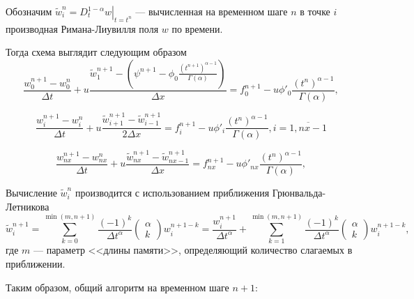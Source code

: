 Обозначим $\tilde{w}^n_i = \left.D^{1-\alpha}_t w \right|_{t=t^n}$ --- вычисленная на временном шаге $n$ в точке $i$ производная Римана-Лиувилля поля $w$ по времени.

Тогда схема выглядит следующим образом
\begin{equation}
	\label{eq:num2}
	\frac{w^{n+1}_{0} - w^{n}_{0}}{\Delta t}
	+ u
	\frac
		{\tilde{w}_1^{n+1} -
			\left( \psi^{n+1} - \phi_0
			\frac
				{\left(t^{n+1}\right)^{\alpha - 1}}
				{\Gamma(\alpha)}
			\right)
		}
		{\Delta x} 
	= f_0^{n+1} - u \phi'_0\frac{\left(t^n\right)^{\alpha - 1}}{\Gamma(\alpha)},
\end{equation}

\begin{equation}
	\label{eq:num3}
	\frac{w^{n+1}_{i} - w^{n}_{i}}{\Delta t}
	+ u \frac{
		\tilde{w}^{n+1}_{i+1} -
		\tilde{w}^{n+1}_{i-1} }
	{2 \Delta x}
	= f_i^{n+1} - u \phi'_{i}\frac{\left(t^n\right)^{\alpha - 1}}{\Gamma(\alpha)},
	i=\overline{1,nx-1}
\end{equation}

\begin{equation}
	\label{eq:num4}
	\frac{w^{n+1}_{nx} - w^{n}_{nx}}{\Delta t}
	+ u \frac{
		\tilde{w}^{n+1}_{nx} -
		\tilde{w}^{n+1}_{nx-1} }
	{\Delta x}
	= f_{nx}^{n+1} - u \phi'_{nx}\frac{\left(t^n\right)^{\alpha - 1}}{\Gamma(\alpha)},
\end{equation}

Вычисление $\tilde{w}^n_i$ производится с использованием приближения Грюнвальда-Летникова
\begin{equation}
	\label{eq:num5}
	\tilde{w}^{n+1}_i
	= \sum_{k=0}^{\min (m,n+1)}
	\frac{(-1)^k}{\Delta t^\alpha} \begin{pmatrix}\alpha \\ k \end{pmatrix}
	w^{n+1-k}_{i}
	= \frac{w^{n+1}_{i}}{\Delta t^\alpha}
	+ \sum_{k=1}^{\min (m,n+1)}
	\frac{(-1)^k}{\Delta t^\alpha} \begin{pmatrix}\alpha \\ k \end{pmatrix}
	w^{n+1-k}_{i},
\end{equation}
где $m$ --- параметр <<длины памяти>>, определяющий количество слагаемых в приближении.

Таким образом, общий алгоритм на временном шаге $n+1$:



